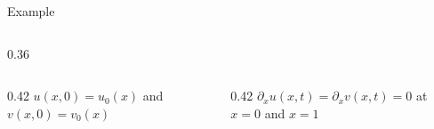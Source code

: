 \begin{frame}{Example}
\begin{columns}[c,onlytextwidth]
\begin{column}{0.36\textwidth}
    \end{column}

  \end{columns}

  \vspace{0.20cm}

  \begin{columns}[T,onlytextwidth]

    \begin{column}{0.42\textwidth}
        {$u(x,0)=u_0(x)$ and $v(x,0)=v_0(x)$}
    \end{column}

    \begin{column}{0.42\textwidth}
        {$\partial_x u(x,t)=\partial_x v(x,t)=0$ at $x=0$ and $x=1$}
    \end{column}

  \end{columns}

\end{frame}


